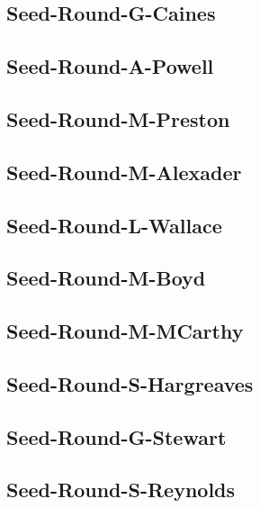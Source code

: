 \documentclass[letterpaper,10pt,openany,oneside,english]{sphinxmanual}
\begin{document}
\subsection{Seed-Round-G-Caines}
\label{\detokenize{statements:seed-round-g-caines}}

\subsection{Seed-Round-A-Powell}
\label{\detokenize{statements:seed-round-a-powell}}

\subsection{Seed-Round-M-Preston}
\label{\detokenize{statements:seed-round-m-preston}}

\subsection{Seed-Round-M-Alexader}
\label{\detokenize{statements:seed-round-m-alexader}}

\subsection{Seed-Round-L-Wallace}
\label{\detokenize{statements:seed-round-l-wallace}}

\subsection{Seed-Round-M-Boyd}
\label{\detokenize{statements:seed-round-m-boyd}}

\subsection{Seed-Round-M-MCarthy}
\label{\detokenize{statements:seed-round-m-mcarthy}}

\subsection{Seed-Round-S-Hargreaves}
\label{\detokenize{statements:seed-round-s-hargreaves}}

\subsection{Seed-Round-G-Stewart}
\label{\detokenize{statements:seed-round-g-stewart}}

\subsection{Seed-Round-S-Reynolds}
\label{\detokenize{statements:seed-round-s-reynolds}}
\end{document}
